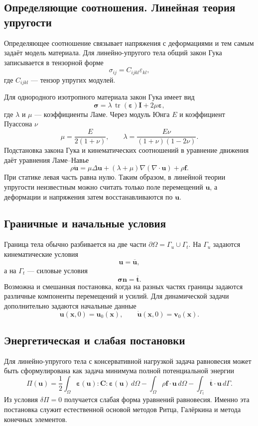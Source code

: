 \subsection{Определяющие соотношения. Линейная теория упругости}

Определяющее соотношение связывает напряжения с деформациями и тем самым
задаёт модель материала. Для линейно-упругого тела общий закон Гука записывается
в тензорной форме
\[
    \sigma_{ij}=C_{ijkl}\varepsilon_{kl},
\]
где $C_{ijkl}$ --- тензор упругих модулей.

Для однородного изотропного материала закон Гука имеет вид
\[
    \boldsymbol\sigma
    =\lambda\,\operatorname{tr}(\boldsymbol\varepsilon)\mathbf I
     +2\mu\boldsymbol\varepsilon,
\]
где $\lambda$ и $\mu$ --- коэффициенты Ламе. Через модуль Юнга $E$ и
коэффициент Пуассона $\nu$
\[
    \mu=\frac{E}{2(1+\nu)},
    \qquad
    \lambda=\frac{E\nu}{(1+\nu)(1-2\nu)}.
\]
Подстановка закона Гука и кинематических соотношений в уравнение движения даёт
уравнения Ламе--Навье
\[
    \rho\ddot{\mathbf u}
    =\mu\Delta\mathbf u
     +(\lambda+\mu)\nabla(\nabla\!\cdot\!\mathbf u)
     +\rho\mathbf f.
\]
При статике левая часть равна нулю. Таким образом, в линейной теории упругости
неизвестным можно считать только поле перемещений $\mathbf u$, а деформации и
напряжения затем восстанавливаются по $\mathbf u$.

\subsection{Граничные и начальные условия}

Граница тела обычно разбивается на две части
$\partial\Omega=\Gamma_u\cup\Gamma_t$. На $\Gamma_u$ задаются кинематические
условия
\[
    \mathbf u=\overline{\mathbf u},
\]
а на $\Gamma_t$ --- силовые условия
\[
    \boldsymbol\sigma\mathbf n=\overline{\mathbf t}.
\]
Возможна и смешанная постановка, когда на разных частях границы задаются
различные компоненты перемещений и усилий. Для динамической задачи дополнительно
задаются начальные данные
\[
    \mathbf u(\mathbf x,0)=\mathbf u_0(\mathbf x),
    \qquad
    \dot{\mathbf u}(\mathbf x,0)=\mathbf v_0(\mathbf x).
\]

\subsection{Энергетическая и слабая постановки}

Для линейно-упругого тела с консервативной нагрузкой задача равновесия может
быть сформулирована как задача минимума полной потенциальной энергии
\[
    \Pi(\mathbf u)
    =\frac12\int_{\Omega}
       \boldsymbol\varepsilon(\mathbf u):\mathbf C:
       \boldsymbol\varepsilon(\mathbf u)\,d\Omega
     -\int_{\Omega}\rho\mathbf f\cdot\mathbf u\,d\Omega
     -\int_{\Gamma_t}\overline{\mathbf t}\cdot\mathbf u\,d\Gamma.
\]
Из условия $\delta\Pi=0$ получается слабая форма уравнений равновесия. Именно
эта постановка служит естественной основой методов Ритца, Галёркина и метода
конечных элементов.


